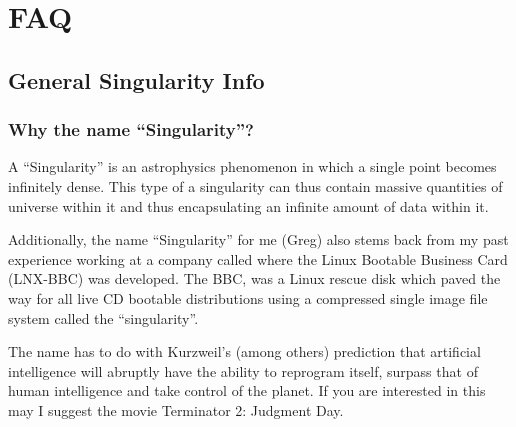 \documentclass[letterpaper,10pt,english]{sphinxmanual}
\begin{document}
\chapter{FAQ}
\label{\detokenize{faq:faq}}\label{\detokenize{faq::doc}}

\section{General Singularity Info}
\label{\detokenize{faq:general-singularity-info}}\label{\detokenize{faq:sec-faq}}

\subsection{Why the name “Singularity”?}
\label{\detokenize{faq:why-the-name-singularity}}
A “Singularity” is an astrophysics phenomenon in which a single point becomes infinitely dense.
This type of a singularity can thus contain massive quantities of universe within it and thus encapsulating an infinite amount of data within it.

Additionally, the name “Singularity” for me (Greg) also stems back from my past experience working at a company called 
where the Linux Bootable Business Card (LNX-BBC) was developed. The BBC, was a Linux rescue disk which paved the way for all live CD bootable
distributions using a compressed single image file system called the “singularity”.

The name has    to do with Kurzweil’s (among others) prediction that artificial intelligence will abruptly have the ability to reprogram itself,
surpass that of human intelligence and take control of the planet. If you are interested in this may I suggest the movie Terminator 2: Judgment Day.
\end{document}
